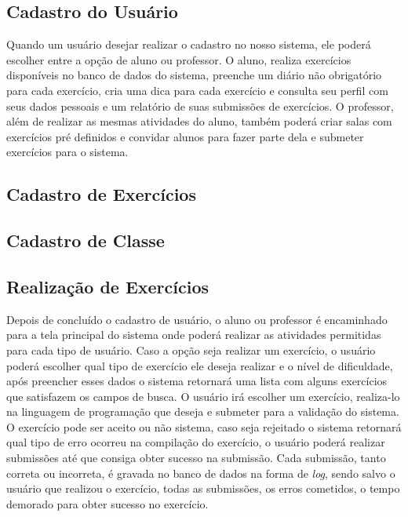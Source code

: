 \subsection{Cadastro do Usuário}

Quando um usuário desejar realizar o cadastro no nosso sistema, ele poderá escolher entre a opção de aluno ou professor. O aluno, realiza exercícios disponíveis no banco de dados do sistema, preenche um diário não obrigatório para cada exercício, cria uma dica para cada exercício e consulta seu perfil com seus dados pessoais e um relatório de suas submissões de exercícios. O professor, além de realizar as mesmas atividades do aluno, também poderá criar salas com exercícios pré definidos e convidar alunos para fazer parte dela e submeter exercícios para o sistema.

\subsection{Cadastro de Exercícios}

\subsection{Cadastro de Classe}

\subsection{Realização de Exercícios}

Depois de concluído o cadastro de usuário, o aluno ou professor é encaminhado para a tela principal do sistema onde poderá realizar as atividades permitidas para cada tipo de usuário. Caso a opção seja realizar um exercício, o usuário poderá escolher qual tipo de exercício ele deseja realizar e o nível de dificuldade, após preencher esses dados o sistema retornará uma lista com alguns exercícios que satisfazem os campos de busca. O usuário irá escolher um exercício, realiza-lo na linguagem de programação que deseja e submeter para a validação do sistema. O exercício pode ser aceito ou não sistema, caso seja rejeitado o sistema retornará qual tipo de erro ocorreu na compilação do exercício, o usuário poderá realizar submissões até que consiga obter sucesso na submissão. Cada submissão, tanto correta ou incorreta, é gravada no banco de dados na forma de \textit{log}, sendo salvo o usuário que realizou o exercício, todas as submissões, os erros cometidos, o tempo demorado para obter sucesso no exercício.

